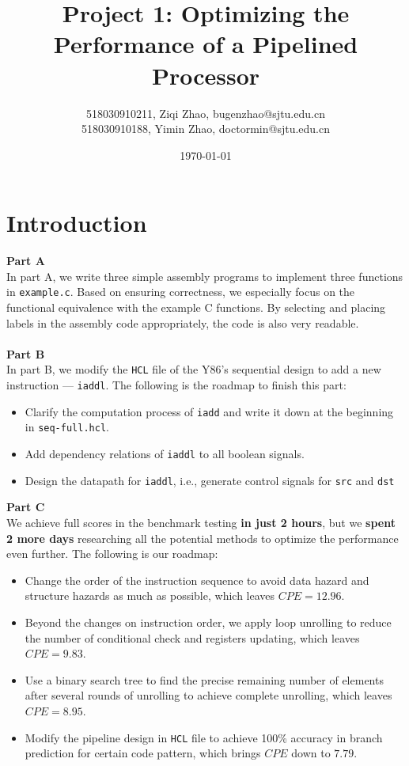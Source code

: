 \documentclass{article}
\title{\textbf{Project 1: Optimizing the Performance of a Pipelined Processor}} %
\author{518030910211, Ziqi Zhao, bugenzhao@sjtu.edu.cn \\
        518030910188, Yimin Zhao, doctormin@sjtu.edu.cn \\ } %
\date{\today} %
\begin{document}
\maketitle %

\section{Introduction}
\textbf{Part A}
\\
In part A, we write three simple assembly programs to implement three functions in \texttt{example.c}. 
Based on ensuring correctness, we especially focus on the functional equivalence with the example C functions. 
By selecting and placing labels in the assembly code appropriately, the code is also very readable.\\ \\
\textbf{Part B}
\\
In part B, we modify the \texttt{HCL} file of the Y86's sequential design to add a new instruction --- \texttt{iaddl}. 
The following is the roadmap to finish this part:
\begin{itemize}
        \item Clarify the computation process of \texttt{iadd} and write it down at the beginning in \texttt{seq-full.hcl}.
        \item Add dependency relations of \texttt{iaddl} to all boolean signals.
        \item Design the datapath for \texttt{iaddl}, i.e., generate control signals for \texttt{src} and \texttt{dst}
\end{itemize}
\textbf{Part C}
\\
We achieve full scores in the benchmark testing \textbf{in just 2 hours}, 
but we \textbf{spent 2 more days} researching all the potential methods to optimize the performance even further. 
The following is our roadmap:
\begin{itemize}
        \item Change the order of the instruction sequence to avoid data hazard and structure hazards as much as possible, which leaves $CPE = 12.96$.
        \item Beyond the changes on instruction order, we apply loop unrolling to reduce the number of conditional check and registers updating, which leaves $CPE = 9.83$.
        \item Use a binary search tree to find the precise remaining number of elements after several rounds of unrolling to achieve complete unrolling, which leaves $CPE = 8.95$.
        \item Modify the pipeline design in \texttt{HCL} file to achieve 100\% accuracy in branch prediction for certain code pattern, which brings $CPE$ down to $7.79$.
\end{itemize}
\end{document}
